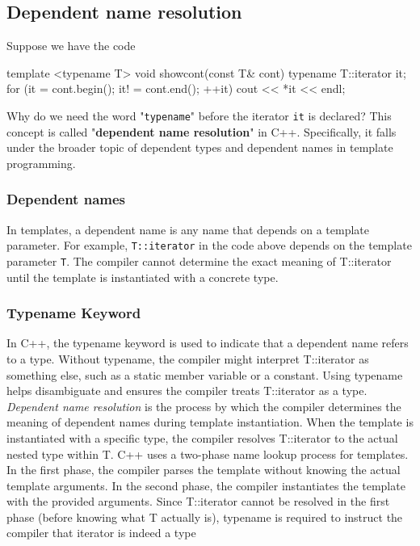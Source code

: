 \documentclass{report}
\begin{document}
    \bigbreak \noindent 
    \subsection{Dependent name resolution}
    \bigbreak \noindent 
    Suppose we have the code
    \begin{cppcode}
    template <typename T>
    void showcont(const T& cont) {
        typename T::iterator it;
        for (it = cont.begin(); it! = cont.end(); ++it) 
            cout << *it << endl;
    }
    \end{cppcode}
    \bigbreak \noindent 
    Why do we need the word "\texttt{typename}" before the iterator \texttt{it} is declared?
    \bigbreak \noindent 
    This concept is called "\textbf{dependent name resolution}" in C++. Specifically, it falls under the broader topic of dependent types and dependent names in template programming.
    \bigbreak \noindent 
    \subsubsection{Dependent names}
    \bigbreak \noindent 
    In templates, a dependent name is any name that depends on a template parameter. For example, \texttt{T::iterator} in the code above depends on the template parameter \texttt{T}. The compiler cannot determine the exact meaning of T::iterator until the template is instantiated with a concrete type.
    \bigbreak \noindent 
    \subsubsection{Typename Keyword}
    \bigbreak \noindent 
     In C++, the typename keyword is used to indicate that a dependent name refers to a type. Without typename, the compiler might interpret T::iterator as something else, such as a static member variable or a constant. Using typename helps disambiguate and ensures the compiler treats T::iterator as a type.
     \bigbreak \noindent 
     \textit{Dependent name resolution} is the process by which the compiler determines the meaning of dependent names during template instantiation. When the template is instantiated with a specific type, the compiler resolves T::iterator to the actual nested type within T.
     \bigbreak \noindent 
     C++ uses a two-phase name lookup process for templates. In the first phase, the compiler parses the template without knowing the actual template arguments. In the second phase, the compiler instantiates the template with the provided arguments. Since T::iterator cannot be resolved in the first phase (before knowing what T actually is), typename is required to instruct the compiler that iterator is indeed a type
     \bigbreak \noindent 
\end{document}
